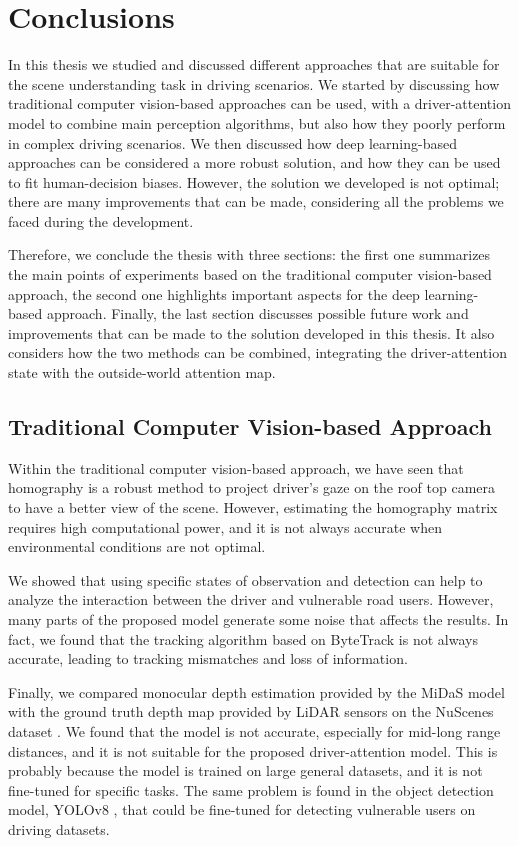 \chapter{Conclusions}
\label{chpt:conclusion}

In this thesis we studied and discussed different approaches that are suitable 
for the scene understanding task in driving scenarios. 
We started by discussing how traditional 
computer vision-based approaches can be used, with a driver-attention model to 
combine main perception algorithms, but also how they poorly perform in complex 
driving scenarios.
We then discussed how deep learning-based approaches can be considered a more 
robust solution, and how they can be used to fit human-decision biases.
However, the solution we developed is not optimal; there are many improvements 
that can be made, considering all the problems we faced during the development.

Therefore, we conclude the thesis with three sections: the first one 
summarizes the main points of experiments based on the traditional computer 
vision-based approach, the second one highlights important aspects for 
the deep learning-based approach. Finally, the last section discusses 
possible future work and improvements that can be made to the solution 
developed in this thesis. It also considers how the two methods can be 
combined, integrating the driver-attention state with the outside-world 
attention map.

\section{Traditional Computer Vision-based Approach}
Within the traditional computer vision-based approach, we have seen that 
homography is a robust method to project driver's gaze on the roof top camera 
to have a better view of the scene. However, estimating the homography matrix 
requires high computational power, and it is not always accurate when 
environmental conditions are not optimal.

We showed that using specific states of observation and detection can help to 
analyze the interaction between the driver and vulnerable road users. However, 
many parts of the proposed model generate some noise that affects the results. 
In fact, we found that the tracking algorithm based on ByteTrack \cite{bytetrack}
is not always accurate, leading to tracking mismatches and loss of information.

Finally, we compared monocular depth estimation provided by the MiDaS model 
\cite{midas} with the ground truth depth map provided by LiDAR sensors on the 
NuScenes dataset \cite{nuscenes}. We found that the model is not accurate, 
especially for mid-long range distances, and it is not suitable for the 
proposed driver-attention model. This is probably because the model is trained 
on large general datasets, and it is not fine-tuned for specific tasks.
The same problem is found in the object detection model, YOLOv8 \cite{yolo}, that 
could be fine-tuned for detecting vulnerable users on driving datasets.

